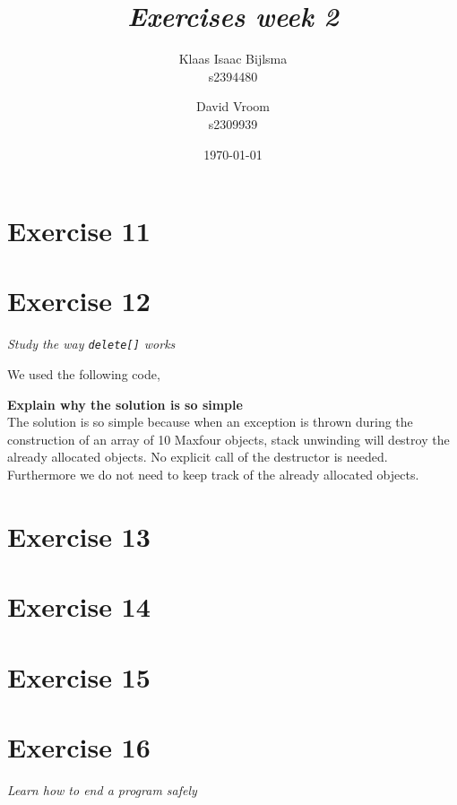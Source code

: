 \documentclass[12pt]{article}
\title{\itshape Exercises week 2}
\author{
	Klaas Isaac Bijlsma \\ s2394480
	\and
	David Vroom \\ s2309939
}
\date{\today}
\newcommand{\desc}[1]{\textit{#1} \vspace{1em}}
\begin{document}
\maketitle

\section*{Exercise 11}
\desc{}


\clearpage
\section*{Exercise 12}
\desc{Study the way \texttt{delete[]} works}

We used the following code,








%

\textbf{Explain why the solution is so simple}\\
The solution is so simple because when an exception is thrown during the construction of an array of 10 Maxfour objects, stack unwinding will destroy the already allocated objects. No explicit call of the destructor is needed. Furthermore we do not need to keep track of the already allocated objects. 

\clearpage
\section*{Exercise 13}
\desc{}

\clearpage
\section*{Exercise 14}
\desc{}


\clearpage
\section*{Exercise 15}
\desc{}

\clearpage
\section*{Exercise 16}
\desc{Learn how to end a program safely}
\end{document}
